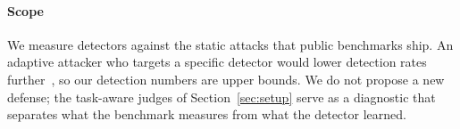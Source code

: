 \paragraph{Scope}
We measure detectors against the static attacks that public benchmarks ship. An adaptive attacker who targets a specific detector would lower detection rates further~\cite{attackermovessecond}, so our detection numbers are upper bounds. We do not propose a new defense; the task-aware judges of Section~\ref{sec:setup} serve as a diagnostic that separates what the benchmark measures from what the detector learned.
